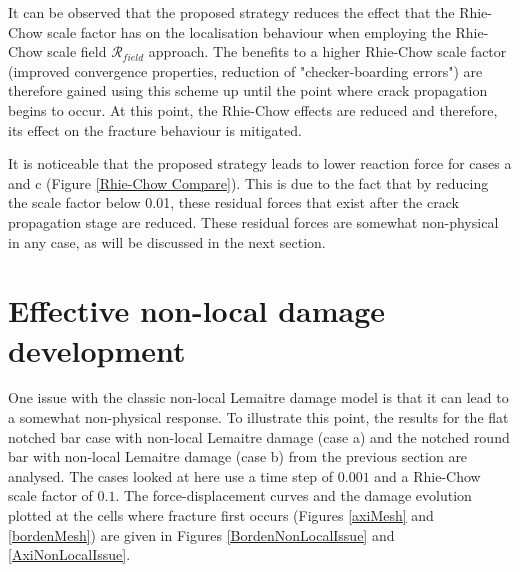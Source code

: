 \documentclass[sn-mathphys,Numbered,draft]{sn-jnl}%
\begin{document}
It can be observed that the proposed strategy reduces the effect that the Rhie-Chow scale factor has on the localisation behaviour when employing the Rhie-Chow scale field $\mathcal{R}_{field}$ approach. The benefits to a higher Rhie-Chow scale factor (improved convergence properties, reduction of "checker-boarding errors") are therefore gained using this scheme up until the point where crack propagation begins to occur. At this point, the Rhie-Chow effects are reduced and therefore, its effect on the fracture behaviour is mitigated.

It is noticeable that the proposed strategy leads to lower reaction force for cases a and c (Figure \ref{Rhie-Chow Compare}). This is due to the fact that by reducing the scale factor below 0.01, these residual forces that exist after the crack propagation stage are reduced. These residual forces are somewhat non-physical in any case, as will be discussed in the next section.

\section{Effective non-local damage development}

One issue with the classic non-local Lemaitre damage model is that it can lead to a somewhat non-physical response. To illustrate this point, the results for the flat notched bar case with non-local Lemaitre damage (case a) and the notched round bar with non-local Lemaitre damage (case b) from the previous section are analysed. The cases looked at here use a time step of $0.001$ and a Rhie-Chow scale factor of $0.1$. The force-displacement curves and the damage evolution plotted at the cells where fracture first occurs (Figures \ref{axiMesh} and \ref{bordenMesh}) are given in Figures \ref{BordenNonLocalIssue} and \ref{AxiNonLocalIssue}.
\end{document}

